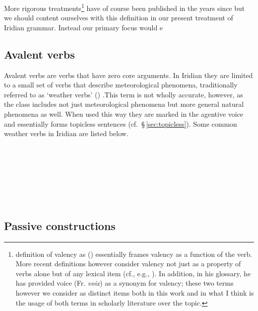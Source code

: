 More rigorous treatments\footnote{ definition of valency as  () essentially frames valency as a function of the verb. More recent definitions however consider valency not just as a property of verbs alone but of any lexical item (cf., e.g., \cite{matthews1997,trask1993}). In addition, in his glossary, he has provided voice (Fr. \emph{voix}) as a synonym for valency; these two terms however we consider as distinct items both in this work and in what I think is the usage of both terms in scholarly literature over the topic.} have of course been published in the years since but we should content ourselves with this definition in our present treatment of Iridian grammar. Instead our primary focus would e

\subsection{Avalent verbs}

Avalent verbs  are verbs that have zero core arguments. In Iridian they are limited to a small set of verbs that describe meteorological phenomena, traditionally referred to as `weather verbs' () .This term is not wholly accurate, however, as the class includes not just meteorological phenomena but more general natural phenomena as well. When used this way they are marked in the agentive voice and essentially forms topicless sentences (cf.~\S\,\ref{sec:topicless}). Some common weather verbs in Iridian are listed below.

\pex{}
\\
\\
\\
\\
\\
\\
\xe



\subsection{Passive constructions}


